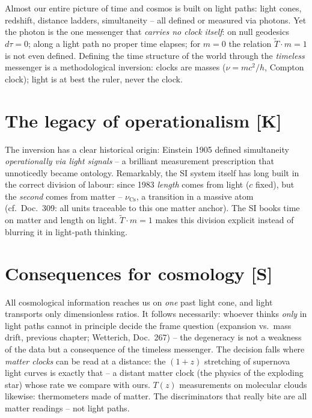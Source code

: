 Almost our entire picture of time and cosmos is built on light
paths: light cones, redshift, distance ladders, simultaneity -- all
defined or measured via photons. Yet the photon is the one
messenger that \emph{carries no clock itself}: on null geodesics
$d\tau = 0$; along a light path no proper time elapses; for
$m = 0$ the relation $\tilde T \cdot m = 1$ is not even defined.
Defining the time structure of the world through the
\emph{timeless} messenger is a methodological inversion: clocks
are masses ($\nu = mc^2/h$, Compton clock); light is at best the
ruler, never the clock.

\section{The legacy of operationalism [K]}

The inversion has a clear historical origin: Einstein 1905 defined
simultaneity \emph{operationally via light signals} -- a brilliant
measurement prescription that unnoticedly became ontology.
Remarkably, the SI system itself has long built in the correct
division of labour: since 1983 \emph{length} comes from light
($c$ fixed), but the \emph{second} comes from matter --
$\nu_\text{Cs}$, a transition in a massive atom (cf.\ Doc.~309:
all units traceable to this one matter anchor). The SI books time
on matter and length on light. $\tilde T \cdot m = 1$ makes this
division explicit instead of blurring it in light-path thinking.

\section{Consequences for cosmology [S]}

All cosmological information reaches us on \emph{one} past light
cone, and light transports only dimensionless ratios. It follows
necessarily: whoever thinks \emph{only} in light paths cannot in
principle decide the frame question (expansion vs.\ mass drift,
previous chapter; Wetterich, Doc.~267) -- the degeneracy is not a
weakness of the data but a consequence of the timeless messenger.
The decision falls where \emph{matter clocks} can be read at a
distance: the $(1+z)$ stretching of supernova light curves is
exactly that -- a distant matter clock (the physics of the
exploding star) whose rate we compare with ours. $T(z)$
measurements on molecular clouds likewise: thermometers made of
matter. The discriminators that really bite are all matter
readings -- not light paths.


